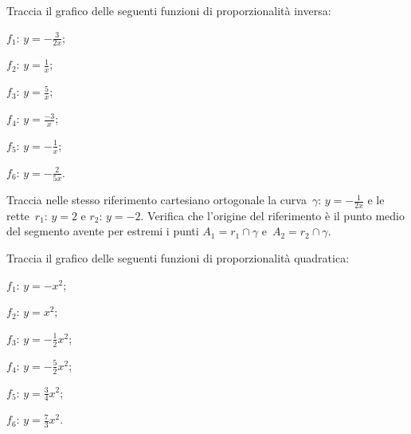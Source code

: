\pagebreak

\begin{esercizio}
\label{ese:D.51}
Traccia il grafico delle seguenti funzioni di proporzionalità inversa:
\begin{multicols}{3}
 \begin{enumeratea}
\item $f_{1}:\, y=-{\frac{3}{2x}}$;
\item $f_{2}:\, y=\frac{1}{x}$;
\item $f_{3}:\, y=\frac{5}{x}$;
\item $f_{4}:\, y=\frac{-3}{x}$;
\item $f_{5}:\, y=-{\frac{1}{x}}$;
\item $f_{6}:\, y=-\frac{2}{5x}$.
\end{enumeratea}
\end{multicols}
\end{esercizio}

\begin{esercizio}
\label{ese:D.52}
Traccia nelle stesso riferimento cartesiano ortogonale la curva~$\gamma:\, y=-{\frac{1}{2x}}$ e le rette~$r_{1}:\, y=2$ e
$r_{2}:\, y=-2$. Verifica che l'origine del riferimento è il punto medio del segmento avente per estremi i punti
$A_{1}=r_{1}\cap \gamma$ e~$A_{2}=r_{2}\cap \gamma$.
\end{esercizio}

\begin{esercizio}
\label{ese:D.53}
Traccia il grafico delle seguenti funzioni di proporzionalità quadratica:
\begin{multicols}{3}
 \begin{enumeratea}
\item $f_{1}:\, y=-x^{2}$;
\item $f_{2}:\, y=x^{2}$;
\item $f_{3}:\, y=-{\frac{1}{2}}x^{2}$;
\item $f_{4}:\, y=-{\frac{5}{2}}x^{2}$;
\item $f_{5}:\, y=\frac{3}{4}x^{2}$;
\item $f_{6}:\, y=\frac{7}{3}x^{2}$.
\end{enumeratea}
\end{multicols}
\end{esercizio}

